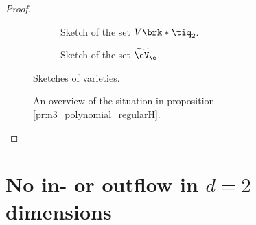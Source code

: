 \begin{proof}
\begin{figure}
    \hfill
    \begin{subfigure}[b]{0.3\textwidth}
    \centering
    
    \caption{Sketch of the set $V\brk*{\tiq_2}$.}
    \label{fi:n3_polynomial_intersectionOriginOtherTerm}
    \end{subfigure}
    \hfill
    \begin{subfigure}[b]{0.3\textwidth}
    \centering
    
    \caption{Sketch of the set $\widetilde{\cV}_\e$.}
    \label{fi:n3_polynomial_intersectionOriginRegular}
    \end{subfigure}
    \caption{Sketches of varieties.}
  \end{figure}
  \begin{figure}
    \centering
    
    \caption{An overview of the situation in proposition \ref{pr:n3_polynomial_regularH}.}
    \label{fi:n3_polynomial_intersectionOrigin_overview}
  \end{figure}
\end{proof}




\chapter{No in- or outflow in $d=2$ dimensions}

